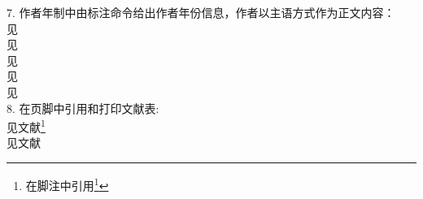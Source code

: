 \documentclass{article}%
\begin{document}
7. 作者年制中由标注命令给出作者年份信息，作者以主语方式作为正文内容：\\
	见\cite{蔡敏2006--}\\
	见\parencite{蔡敏2006--}\\
	见\textcite{蔡敏2006--}\\
	见\citet{蔡敏2006--}\\
	见\citep{蔡敏2006--}\\

8. 在页脚中引用和打印文献表:\\
	见文献\footnote{在脚注中引用\footcite{蔡敏2006--}}\\
	见文献


	\printbibliography[heading=bibliography,title=参考文献]
\end{document}
